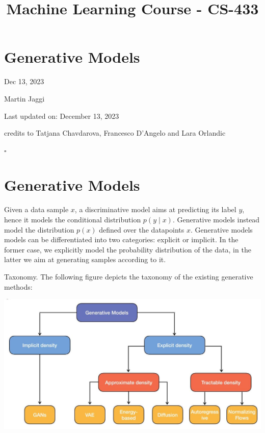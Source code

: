 \documentclass[10pt]{article}
\title{Machine Learning Course - CS-433 }
\author{}
\date{}
\begin{document}
\maketitle
\section*{Generative Models}
Dec 13, 2023

Martin Jaggi

Last updated on: December 13, 2023

credits to Tatjana Chavdarova, Francesco D'Angelo and Lara Orlandic

$\square$

\section*{Generative Models}
Given a data sample $x$, a discriminative model aims at predicting its label $y$, hence it models the conditional distribution $p(y \mid x)$. Generative models instead model the distribution $p(x)$ defined over the datapoints $x$. Generative models models can be differentiated into two categories: explicit or implicit. In the former case, we explicitly model the probability distribution of the data, in the latter we aim at generating samples according to it.

Taxonomy. The following figure depicts the taxonomy of the existing generative methods:

\begin{center}
\includegraphics[max width=\textwidth]{2024_01_08_a381fc3992661ee7020eg-02}
\end{center}
\end{document}

